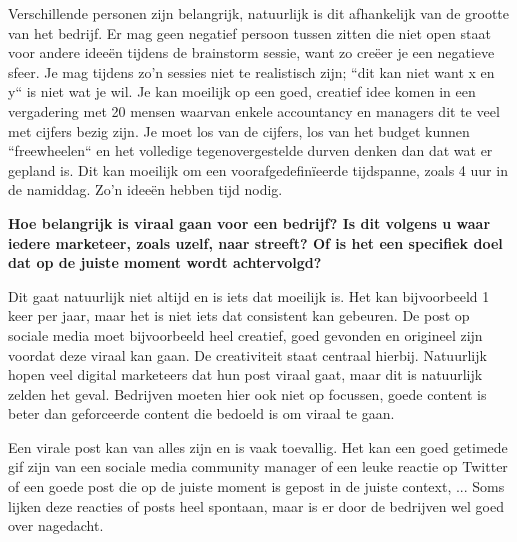 	Verschillende personen zijn belangrijk, natuurlijk is dit afhankelijk van de grootte van het bedrijf. Er mag geen negatief persoon tussen zitten die niet open staat voor andere ideeën tijdens de brainstorm sessie, want zo creëer je een negatieve sfeer. Je mag tijdens zo'n sessies niet te realistisch zijn; ``dit kan niet want x en y`` is niet wat je wil. Je kan moeilijk op een goed, creatief idee komen in een vergadering met 20 mensen waarvan enkele accountancy en managers dit te veel met cijfers bezig zijn. Je moet los van de cijfers, los van het budget kunnen ``freewheelen`` en het volledige tegenovergestelde durven denken dan dat wat er gepland is. Dit kan moeilijk om een voorafgedefinïeerde tijdspanne, zoals 4 uur in de namiddag. Zo'n ideeën hebben tijd nodig.
	
\textbf{Hoe belangrijk is viraal gaan voor een bedrijf? Is dit volgens u waar iedere marketeer, zoals uzelf, naar streeft? Of is het een specifiek doel dat op de juiste moment wordt achtervolgd?}
	
Dit gaat natuurlijk niet altijd en is iets dat moeilijk is. Het kan bijvoorbeeld 1 keer per jaar, maar het is niet iets dat consistent kan gebeuren. De post op sociale media moet bijvoorbeeld heel creatief, goed gevonden en origineel zijn voordat deze viraal kan gaan. De creativiteit staat centraal hierbij. Natuurlijk hopen veel digital marketeers dat hun post viraal gaat, maar dit is natuurlijk zelden het geval. Bedrijven moeten hier ook niet op focussen, goede content is beter dan geforceerde content die bedoeld is om viraal te gaan.

Een virale post kan van alles zijn en is vaak toevallig. Het kan een goed getimede gif zijn van een sociale media community manager of een leuke reactie op Twitter of een goede post die op de juiste moment is gepost in de juiste context, ... Soms lijken deze reacties of posts heel spontaan, maar is er door de bedrijven wel goed over nagedacht.
	
